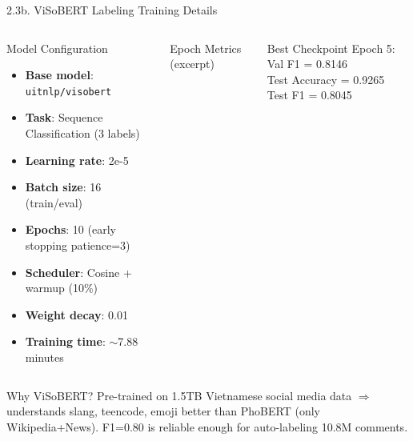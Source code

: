 \documentclass[11pt, aspectratio=169]{beamer}
\begin{document}
\begin{frame}[shrink=8]{2.3b. ViSoBERT Labeling Training Details}

\begin{columns}[T]
  \begin{block}{Model Configuration}
    \begin{itemize}
      \item \textbf{Base model}: \texttt{uitnlp/visobert}
      \item \textbf{Task}: Sequence Classification (3 labels)
      \item \textbf{Learning rate}: 2e-5
      \item \textbf{Batch size}: 16 (train/eval)
      \item \textbf{Epochs}: 10 (early stopping patience=3)
      \item \textbf{Scheduler}: Cosine + warmup (10\%)
      \item \textbf{Weight decay}: 0.01
      \item \textbf{Training time}: $\sim$7.88 minutes
    \end{itemize}
  \end{block}

  \begin{block}{Epoch Metrics (excerpt)}
    \centering
  \end{block}
  \vspace{0.2cm}
  \begin{block}{Best Checkpoint}
    Epoch 5: Val F1 = 0.8146\\
    Test Accuracy = 0.9265\\
    Test F1 = 0.8045
  \end{block}
\end{columns}

\vspace{0.2cm}
\begin{block}{Why ViSoBERT?}
  Pre-trained on 1.5TB Vietnamese social media data $\Rightarrow$ understands slang, teencode, emoji better than PhoBERT (only Wikipedia+News). F1=0.80 is reliable enough for auto-labeling 10.8M comments.
\end{block}
\end{frame}
\end{document}
